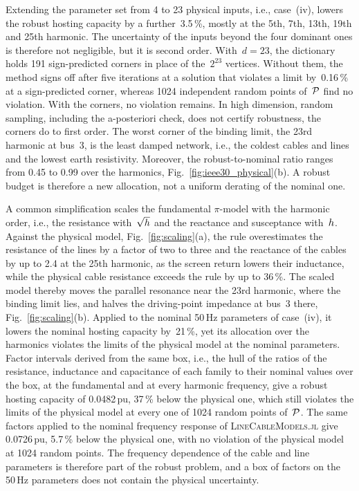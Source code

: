 Extending the parameter set from 4 to 23 physical inputs, i.e., case~(iv), lowers the robust hosting capacity by a further~3.5\,\%, mostly at the 5th, 7th, 13th, 19th and 25th harmonic. The uncertainty of the inputs beyond the four dominant ones is therefore not negligible, but it is second order. With~$d = 23$, the dictionary holds 191 sign-predicted corners in place of the~$2^{23}$ vertices. Without them, the method signs off after five iterations at a solution that violates a limit by~0.16\,\% at a sign-predicted corner, whereas 1024 independent random points of~$\mathcal{P}$ find no violation. With the corners, no violation remains. In high dimension, random sampling, including the a-posteriori check, does not certify robustness, the corners do to first order. The worst corner of the binding limit, the 23rd harmonic at bus~3, is the least damped network, i.e., the coldest cables and lines and the lowest earth resistivity. Moreover, the robust-to-nominal ratio ranges from 0.45 to 0.99 over the harmonics, Fig.~\ref{fig:ieee30_physical}(b). A robust budget is therefore a new allocation, not a uniform derating of the nominal one.

A common simplification scales the fundamental $\pi$-model with the harmonic order, i.e., the resistance with~$\sqrt{h}$ and the reactance and susceptance with~$h$. Against the physical model, Fig.~\ref{fig:scaling}(a), the rule overestimates the resistance of the lines by a factor of two to three and the reactance of the cables by up to 2.4 at the 25th harmonic, as the screen return lowers their inductance, while the physical cable resistance exceeds the rule by up to 36\,\%. The scaled model thereby moves the parallel resonance near the 23rd harmonic, where the binding limit lies, and halves the driving-point impedance at bus~3 there, Fig.~\ref{fig:scaling}(b). Applied to the nominal 50\,Hz parameters of case~(iv), it lowers the nominal hosting capacity by~21\,\%, yet its allocation over the harmonics violates the limits of the physical model at the nominal parameters. Factor intervals derived from the same box, i.e., the hull of the ratios of the resistance, inductance and capacitance of each family to their nominal values over the box, at the fundamental and at every harmonic frequency, give a robust hosting capacity of 0.0482\,pu, 37\,\% below the physical one, which still violates the limits of the physical model at every one of 1024 random points of~$\mathcal{P}$. The same factors applied to the nominal frequency response of \textsc{LineCableModels.jl} give 0.0726\,pu, 5.7\,\% below the physical one, with no violation of the physical model at 1024 random points. The frequency dependence of the cable and line parameters is therefore part of the robust problem, and a box of factors on the 50\,Hz parameters does not contain the physical uncertainty.

